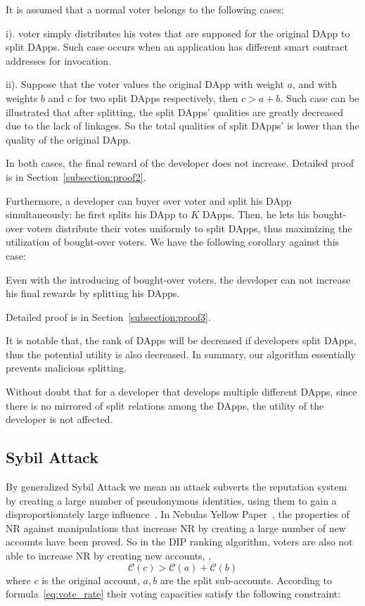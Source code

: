 It is assumed that a normal voter belongs to the following cases:
\begin{inparaenum}
\item[i).] voter simply distributes his votes that are supposed for the original DApp to split DApps. Such case occurs when an application has different smart contract addresses for invocation.
\item[ii).] Suppose that the voter values the original DApp with weight $a$, and with weights $b$ and $c$ for two split DApps respectively, then $c>a+b$. Such case can be illustrated that after splitting, the split DApps' qualities are greatly decreased due to the lack of linkages. So the total qualities of split DApps' is lower than the quality of the original DApp.
 \end{inparaenum}

  In both cases, the final reward of the developer does not increase. Detailed
  proof is in Section~\ref{subsection:proof2}.

Furthermore, a developer can buyer over voter and split his DApp simultaneously: he first splits his DApp to $K$ DApps. Then, he lets his bought-over voters distribute their votes uniformly to split DApps, thus  maximizing the utilization of  bought-over  voters. We have the following corollary against this case:

\begin{corollary}
	\label{c1}
	Even with the introducing of bought-over voters, the developer can not increase his final rewards by splitting his DApps.
\end{corollary}

Detailed proof is in Section~\ref{subsection:proof3}.

It is notable that, the rank of DApps will be decreased if developers split DApps, thus the potential utility is also decreased. In summary, our algorithm essentially prevents malicious splitting.

Without doubt that for a developer that develops multiple different  DApps,
since there is no mirrored of split relations among the DApps, the utility of
the developer is not affected.

\subsection{Sybil Attack}
\noindent By generalized Sybil Attack we mean an attack subverts the reputation system by creating a large number of pseudonymous identities, using them to gain a disproportionately large influence~\cite{quercia2010sybil}. In Nebulas Yellow Paper~\cite{Nebulasyellowpaper}, the properties of NR against manipulations that increase NR by creating a large number of new accounts have been proved. So in the DIP ranking algorithm, voters are also not able to increase NR by creating new accounts, \ie,
$$\mathcal{C}(c)>\mathcal{C}(a)+\mathcal{C}(b)$$
where $c$ is the original account, $a,b$ are the split sub-accounts. According to formula~\ref{eq:vote_rate} their voting capacities satisfy the following constraint:

